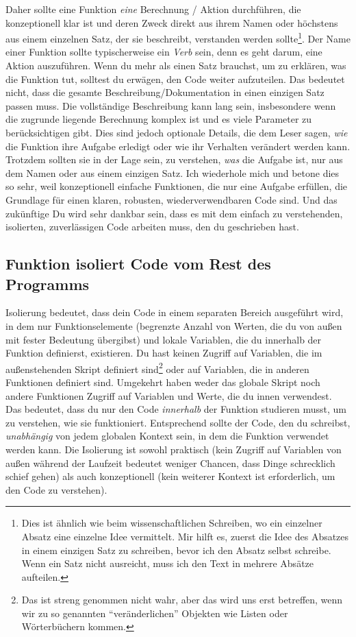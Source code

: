 \documentclass[
]{book}
\begin{document}
Daher sollte eine Funktion \emph{eine} Berechnung / Aktion durchführen, die konzeptionell klar ist und deren Zweck direkt aus ihrem Namen oder höchstens aus einem einzelnen Satz, der sie beschreibt, verstanden werden sollte\footnote{Dies ist ähnlich wie beim wissenschaftlichen Schreiben, wo ein einzelner Absatz eine einzelne Idee vermittelt. Mir hilft es, zuerst die Idee des Absatzes in einem einzigen Satz zu schreiben, bevor ich den Absatz selbst schreibe. Wenn ein Satz nicht ausreicht, muss ich den Text in mehrere Absätze aufteilen.}. Der Name einer Funktion sollte typischerweise ein \emph{Verb} sein, denn es geht darum, eine Aktion auszuführen. Wenn du mehr als einen Satz brauchst, um zu erklären, was die Funktion tut, solltest du erwägen, den Code weiter aufzuteilen. Das bedeutet nicht, dass die gesamte Beschreibung/Dokumentation in einen einzigen Satz passen muss. Die vollständige Beschreibung kann lang sein, insbesondere wenn die zugrunde liegende Berechnung komplex ist und es viele Parameter zu berücksichtigen gibt. Dies sind jedoch optionale Details, die dem Leser sagen, \emph{wie} die Funktion ihre Aufgabe erledigt oder wie ihr Verhalten verändert werden kann. Trotzdem sollten sie in der Lage sein, zu verstehen, \emph{was} die Aufgabe ist, nur aus dem Namen oder aus einem einzigen Satz. Ich wiederhole mich und betone dies so sehr, weil konzeptionell einfache Funktionen, die nur eine Aufgabe erfüllen, die Grundlage für einen klaren, robusten, wiederverwendbaren Code sind. Und das zukünftige Du wird sehr dankbar sein, dass es mit dem einfach zu verstehenden, isolierten, zuverlässigen Code arbeiten muss, den du geschrieben hast.

\hypertarget{funktion-isoliert-code-vom-rest-des-programms}{%
\subsection{Funktion isoliert Code vom Rest des Programms}\label{funktion-isoliert-code-vom-rest-des-programms}}

Isolierung bedeutet, dass dein Code in einem separaten Bereich ausgeführt wird, in dem nur Funktionselemente (begrenzte Anzahl von Werten, die du von außen mit fester Bedeutung übergibst) und lokale Variablen, die du innerhalb der Funktion definierst, existieren. Du hast keinen Zugriff auf Variablen, die im außenstehenden Skript definiert sind\footnote{Das ist streng genommen nicht wahr, aber das wird uns erst betreffen, wenn wir zu so genannten ``veränderlichen'' Objekten wie Listen oder Wörterbüchern kommen.} oder auf Variablen, die in anderen Funktionen definiert sind. Umgekehrt haben weder das globale Skript noch andere Funktionen Zugriff auf Variablen und Werte, die du innen verwendest. Das bedeutet, dass du nur den Code \emph{innerhalb} der Funktion studieren musst, um zu verstehen, wie sie funktioniert. Entsprechend sollte der Code, den du schreibst, \emph{unabhängig} von jedem globalen Kontext sein, in dem die Funktion verwendet werden kann. Die Isolierung ist sowohl praktisch (kein Zugriff auf Variablen von außen während der Laufzeit bedeutet weniger Chancen, dass Dinge schrecklich schief gehen) als auch konzeptionell (kein weiterer Kontext ist erforderlich, um den Code zu verstehen).
\end{document}
